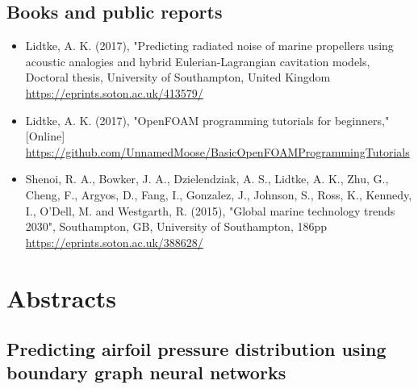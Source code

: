 \documentclass[a4paper,10pt]{article}
\begin{document}
\subsection{Books and public reports}
%
\begin{itemize}
\item Lidtke, A. K. (2017), "Predicting radiated noise of marine propellers using acoustic analogies and hybrid Eulerian-Lagrangian cavitation models,
	Doctoral thesis, University of Southampton, United Kingdom
	\cite{Lidtke2017d}
	\\ \url{https://eprints.soton.ac.uk/413579/}
%
\item Lidtke, A. K. (2017), "OpenFOAM programming tutorials for beginners," [Online]
	\cite{Lidtke2017c}
	\\ \url{https://github.com/UnnamedMoose/BasicOpenFOAMProgrammingTutorials}
%
\item Shenoi, R. A., Bowker, J. A., Dzielendziak, A. S., Lidtke, A. K., Zhu, G., Cheng, F.,
	Argyos, D., Fang, I., Gonzalez, J., Johnson, S., Ross, K., Kennedy, I., O'Dell, M.
	and Westgarth, R. (2015), "Global marine technology trends 2030", Southampton, GB,
	University of Southampton, 186pp
	\cite{Shenoi2015}
	\\ \url{https://eprints.soton.ac.uk/388628/}
%
\end{itemize}

\newpage

\section{Abstracts}

\subsection{Predicting airfoil pressure distribution using boundary graph neural networks \cite{2025_jena_predicting}}
\end{document}
